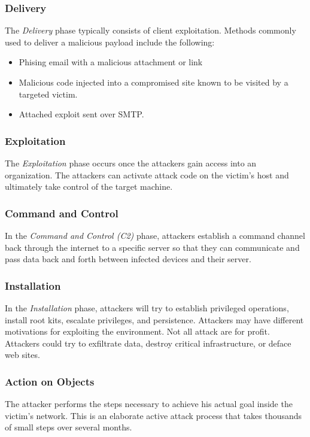 \subsubsection{Delivery}
The \textit{Delivery} phase typically consists of client exploitation. Methods commonly used to deliver a malicious payload include the following:
\begin{itemize}
    \item Phising email with a malicious attachment or link
    \item Malicious code injected into a compromised site known to be visited by a targeted victim.
    \item Attached exploit sent over SMTP.
\end{itemize}

\subsubsection{Exploitation}
The \textit{Exploitation} phase occurs once the attackers gain access into an organization. 
The attackers can activate attack code on the victim's host and ultimately take control of the target machine.

\subsubsection{Command and Control}
In the \textit{Command and Control (C2)} phase, attackers establish a command channel back through the internet to a specific server so that they can communicate and pass data back and forth between infected devices and their server.

\subsubsection{Installation}
In the \textit{Installation} phase, attackers will try to establish privileged operations, install root kits, escalate privileges, and persistence.
Attackers may have different motivations for exploiting the environment. Not all attack are for profit.
Attackers could try to exfiltrate data, destroy critical infrastructure, or deface web sites.

\subsubsection{Action on Objects}
The attacker performs the steps necessary to achieve his actual goal inside the victim's network.
This is an elaborate active attack process that takes thousands of small steps over several months.



